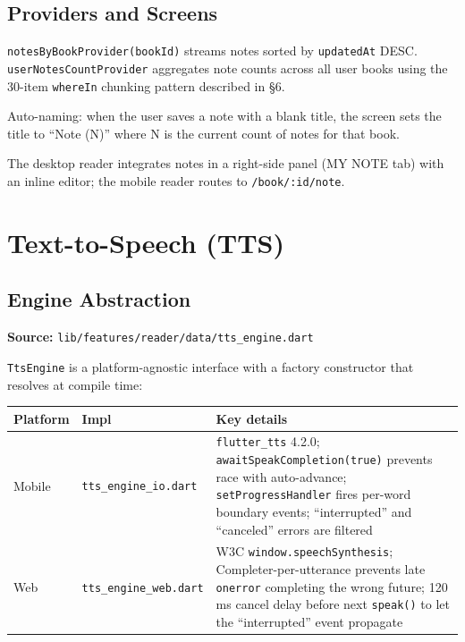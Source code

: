 \documentclass[11pt,a4paper]{article}
\begin{document}
\subsection{Providers and Screens}

\texttt{notesByBookProvider(bookId)} streams notes sorted by \texttt{updatedAt} DESC.
\texttt{userNotesCountProvider} aggregates note counts across all user books using the
30-item \texttt{whereIn} chunking pattern described in §6.

Auto-naming: when the user saves a note with a blank title, the screen sets the title
to ``Note (N)'' where N is the current count of notes for that book.

The desktop reader integrates notes in a right-side panel (MY NOTE tab) with an inline
editor; the mobile reader routes to \texttt{/book/:id/note}.

\section{Text-to-Speech (TTS)}

\subsection{Engine Abstraction}

\textbf{Source:} \texttt{lib/features/reader/data/tts\_engine.dart}

\texttt{TtsEngine} is a platform-agnostic interface with a factory constructor that
resolves at compile time:

\vspace{4pt}
\begin{tabularx}{\textwidth}{@{}L{2.2cm} L{3.6cm} L{7.9cm}@{}}
  \toprule
  \textbf{Platform} & \textbf{Impl} & \textbf{Key details} \\
  \midrule
  Mobile & \texttt{tts\_engine\_io.dart} &
    \texttt{flutter\_tts} 4.2.0; \texttt{awaitSpeakCompletion(true)} prevents race
    with auto-advance; \texttt{setProgressHandler} fires per-word boundary events;
    ``interrupted'' and ``canceled'' errors are filtered \\
  Web & \texttt{tts\_engine\_web.dart} &
    W3C \texttt{window.speechSynthesis}; Completer-per-utterance prevents late
    \texttt{onerror} completing the wrong future; 120\,ms cancel delay before next
    \texttt{speak()} to let the ``interrupted'' event propagate \\
  \bottomrule
\end{tabularx}
\end{document}
